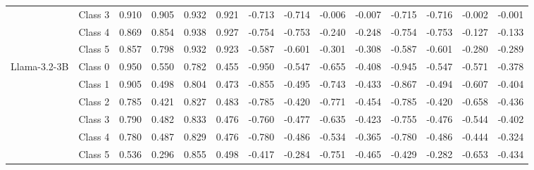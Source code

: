 \begin{table*}[t]
\begin{tabular}{l|l|rrrr|rrrr|rrrr}
&Class 3 & 0.910 & 0.905 & 0.932 & 0.921 & -0.713 & -0.714 & -0.006 & -0.007 & -0.715 & -0.716 & -0.002 & -0.001 \\
&Class 4 & 0.869 & 0.854 & 0.938 & 0.927 & -0.754 & -0.753 & -0.240 & -0.248 & -0.754 & -0.753 & -0.127 & -0.133 \\
&Class 5 & 0.857 & 0.798 & 0.932 & 0.923 & -0.587 & -0.601 & -0.301 & -0.308 & -0.587 & -0.601 & -0.280 & -0.289 \\
\midrule
\multirow{6}{*}{Llama-3.2-3B} 
&Class 0 & 0.950 & 0.550 & 0.782 & 0.455 & -0.950 & -0.547 & -0.655 & -0.408 & -0.945 & -0.547 & -0.571 & -0.378 \\
&Class 1 & 0.905 & 0.498 & 0.804 & 0.473 & -0.855 & -0.495 & -0.743 & -0.433 & -0.867 & -0.494 & -0.607 & -0.404 \\
&Class 2 & 0.785 & 0.421 & 0.827 & 0.483 & -0.785 & -0.420 & -0.771 & -0.454 & -0.785 & -0.420 & -0.658 & -0.436 \\
&Class 3 & 0.790 & 0.482 & 0.833 & 0.476 & -0.760 & -0.477 & -0.635 & -0.423 & -0.755 & -0.476 & -0.544 & -0.402 \\
&Class 4 & 0.780 & 0.487 & 0.829 & 0.476 & -0.780 & -0.486 & -0.534 & -0.365 & -0.780 & -0.486 & -0.444 & -0.324 \\
&Class 5 & 0.536 & 0.296 & 0.855 & 0.498 & -0.417 & -0.284 & -0.751 & -0.465 & -0.429 & -0.282 & -0.653 & -0.434 \\

\bottomrule
\end{tabular}

\label{tab:emotions_on_all}
\end{table*}


